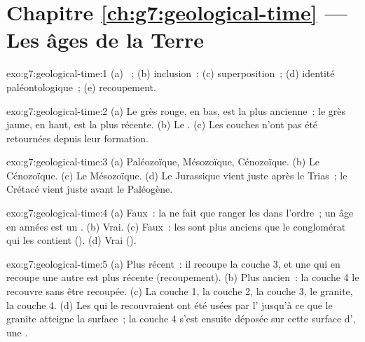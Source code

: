 \section*{Chapitre \ref{ch:g7:geological-time} --- Les âges de la Terre}

\begin{solution}{exo:g7:geological-time:1}
(a) ~; (b) inclusion~; (c) superposition~; (d) identité
paléontologique~; (e) recoupement.
\end{solution}

\begin{solution}{exo:g7:geological-time:2}
(a) Le grès rouge, en bas, est la plus ancienne~; le grès jaune, en haut,
est la plus récente. (b) Le . (c) Les couches
n'ont pas été retournées depuis leur formation.
\end{solution}

\begin{solution}{exo:g7:geological-time:3}
(a) Paléozoïque, Mésozoïque, Cénozoïque. (b) Le Cénozoïque. (c) Le
Mésozoïque. (d) Le Jurassique vient juste après le Trias~; le Crétacé vient
juste avant le Paléogène.
\end{solution}

\begin{solution}{exo:g7:geological-time:4}
(a) Faux~: la  ne fait que ranger les  dans
l'ordre~; un âge en années est un . (b) Vrai. (c) Faux~: les
 sont plus anciens que le conglomérat qui les contient (). (d) Vrai ().
\end{solution}

\begin{solution}{exo:g7:geological-time:5}
(a) Plus récent~: il recoupe la couche 3, et une  qui en recoupe une
autre est plus récente (recoupement). (b) Plus ancien~: la couche 4 le
recouvre sans être recoupée. (c) La couche 1, la couche 2, la couche 3, le
granite, la couche 4. (d) Les  qui le recouvraient ont été usées par
l' jusqu'à ce que le granite atteigne la surface~; la couche 4
s'est ensuite déposée sur cette surface d', une .
\end{solution}

